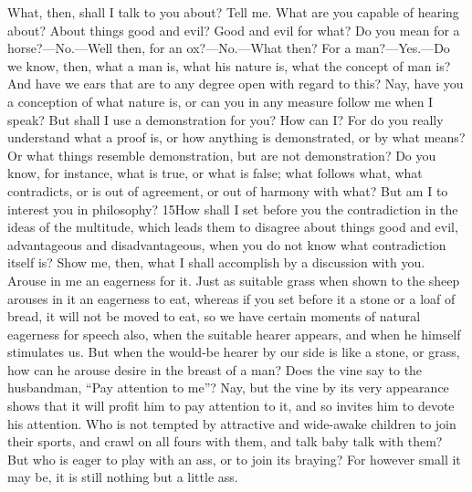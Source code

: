 What, then, shall I talk to you about? Tell me. What are you capable of hearing about? About things good and evil? Good and evil for what? Do you mean for a horse?—No.—Well then, for an ox?—No.—What then? For a man?—Yes.—Do we know, then, what a man is, what his nature is, what the concept of man is? And have we ears that are to any degree open with regard to this? Nay, have you a conception of what nature is, or can you in any measure follow me when I speak? But shall I use a demonstration for you? How can I? For do you really understand what a proof is, or how anything is demonstrated, or by what means? Or what things resemble demonstration, but are not demonstration? Do you know, for instance, what is true, or what is false; what follows what, what contradicts, or is out of agreement, or out of harmony with what? But am I to interest you in philosophy? 15How shall I set before you the contradiction in the ideas of the multitude, which leads them to disagree about things good and evil, advantageous and disadvantageous, when you do not know what contradiction itself is? Show me, then, what I shall accomplish by a discussion with you. Arouse in me an eagerness for it. Just as suitable grass when shown to the sheep arouses in it an eagerness to eat, whereas if you set before it a stone or a loaf of bread, it will not be moved to eat, so we have certain moments of natural eagerness for speech also, when the suitable hearer appears, and when he himself stimulates us. But when the would-be hearer by our side is like a stone, or grass, how can he arouse desire in the breast of a man? Does the vine say to the husbandman, ``Pay attention to me''? Nay, but the vine by its very appearance shows that it will profit him to pay attention to it, and so invites him to devote his attention. Who is not tempted by attractive and wide-awake children to join their sports, and crawl on all fours with them, and talk baby talk with them? But who is eager to play with an ass, or to join its braying? For however small it may be, it is still nothing but a little ass.

